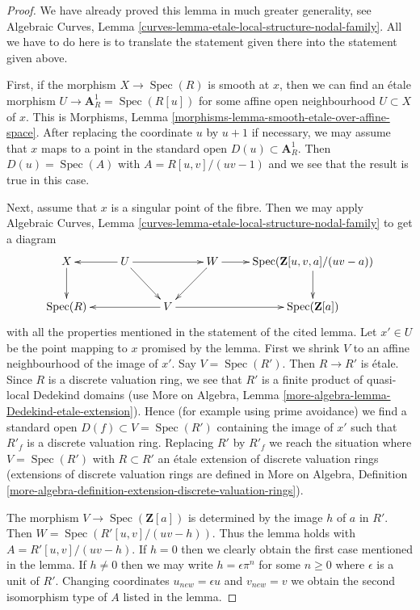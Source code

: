 \documentclass{stacks-project}
\theoremstyle{plain}
\theoremstyle{definition}
\theoremstyle{remark}
\numberwithin{equation}{subsection}
\def\Spec{\mathop{\mathrm{Spec}}}
\begin{document}
\begin{proof}
We have already proved this lemma in much greater generality, see
Algebraic Curves, Lemma \ref{curves-lemma-etale-local-structure-nodal-family}.
All we have to do here is to translate the statement
given there into the statement given above.

\medskip\noindent
First, if the morphism $X \to \Spec(R)$ is smooth at $x$,
then we can find an \'etale morphism $U \to \mathbf{A}^1_R = \Spec(R[u])$ for
some affine open neighbourhood $U \subset X$ of $x$. This is
Morphisms, Lemma \ref{morphisms-lemma-smooth-etale-over-affine-space}.
After replacing the coordinate $u$ by $u + 1$ if necessary, we may
assume that $x$ maps to a point in the standard open
$D(u) \subset \mathbf{A}^1_R$. Then $D(u) = \Spec(A)$ with
$A = R[u, v]/(uv - 1)$ and we see that the result is true in this case.

\medskip\noindent
Next, assume that $x$ is a singular point of the fibre. Then we may apply
Algebraic Curves, Lemma \ref{curves-lemma-etale-local-structure-nodal-family}
to get a diagram
$$
\xymatrix{
X \ar[d] &
U \ar[rr] \ar[l] \ar[rd] & &
W \ar[r] \ar[ld] &
\Spec(\mathbf{Z}[u, v, a]/(uv - a)) \ar[d] \\
\Spec(R) & &
V \ar[ll] \ar[rr] & & \Spec(\mathbf{Z}[a])
}
$$
with all the properties mentioned in the statement of the cited lemma.
Let $x' \in U$ be the point mapping to $x$ promised by the lemma.
First we shrink $V$ to an affine neighbourhood of the image of $x'$.
Say $V = \Spec(R')$. Then $R \to R'$ is \'etale. Since $R$ is a
discrete valuation ring, we see that $R'$ is a finite
product of quasi-local Dedekind domains (use
More on Algebra, Lemma \ref{more-algebra-lemma-Dedekind-etale-extension}).
Hence (for example using prime avoidance) we find a standard
open $D(f) \subset V = \Spec(R')$ containing the image of $x'$
such that $R'_f$ is a discrete valuation ring.
Replacing $R'$ by $R'_f$ we reach the situation where
$V = \Spec(R')$ with $R \subset R'$ an \'etale extension of
discrete valuation rings (extensions of discrete valuation rings
are defined in More on Algebra, Definition
\ref{more-algebra-definition-extension-discrete-valuation-rings}).

\medskip\noindent
The morphism $V \to \Spec(\mathbf{Z}[a])$ is determined by
the image $h$ of $a$ in $R'$. Then $W = \Spec(R'[u, v]/(uv - h))$.
Thus the lemma holds with
$A = R'[u, v]/(uv - h)$. If $h = 0$ then we clearly
obtain the first case mentioned in the lemma. If $h \not = 0$
then we may write $h = \epsilon \pi^n$ for some $n \geq 0$
where $\epsilon$ is a unit of $R'$. Changing coordinates
$u_{new} = \epsilon u$ and $v_{new} = v$ we obtain the second
isomorphism type of $A$ listed in the lemma.
\end{proof}
\end{document}
